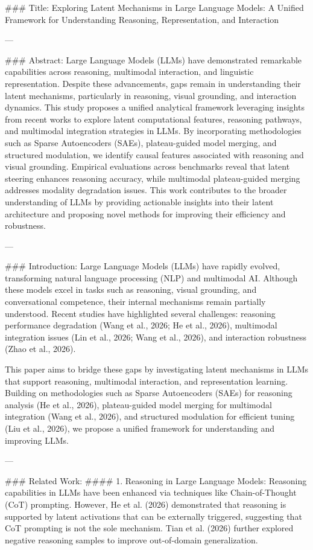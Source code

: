 ### Title:
Exploring Latent Mechanisms in Large Language Models: A Unified Framework for Understanding Reasoning, Representation, and Interaction

---

### Abstract:
Large Language Models (LLMs) have demonstrated remarkable capabilities across reasoning, multimodal interaction, and linguistic representation. Despite these advancements, gaps remain in understanding their latent mechanisms, particularly in reasoning, visual grounding, and interaction dynamics. This study proposes a unified analytical framework leveraging insights from recent works to explore latent computational features, reasoning pathways, and multimodal integration strategies in LLMs. By incorporating methodologies such as Sparse Autoencoders (SAEs), plateau-guided model merging, and structured modulation, we identify causal features associated with reasoning and visual grounding. Empirical evaluations across benchmarks reveal that latent steering enhances reasoning accuracy, while multimodal plateau-guided merging addresses modality degradation issues. This work contributes to the broader understanding of LLMs by providing actionable insights into their latent architecture and proposing novel methods for improving their efficiency and robustness.

---

### Introduction:
Large Language Models (LLMs) have rapidly evolved, transforming natural language processing (NLP) and multimodal AI. Although these models excel in tasks such as reasoning, visual grounding, and conversational competence, their internal mechanisms remain partially understood. Recent studies have highlighted several challenges: reasoning performance degradation (Wang et al., 2026; He et al., 2026), multimodal integration issues (Lin et al., 2026; Wang et al., 2026), and interaction robustness (Zhao et al., 2026).

This paper aims to bridge these gaps by investigating latent mechanisms in LLMs that support reasoning, multimodal interaction, and representation learning. Building on methodologies such as Sparse Autoencoders (SAEs) for reasoning analysis (He et al., 2026), plateau-guided model merging for multimodal integration (Wang et al., 2026), and structured modulation for efficient tuning (Liu et al., 2026), we propose a unified framework for understanding and improving LLMs.

---

### Related Work:
#### 1. Reasoning in Large Language Models:
Reasoning capabilities in LLMs have been enhanced via techniques like Chain-of-Thought (CoT) prompting. However, He et al. (2026) demonstrated that reasoning is supported by latent activations that can be externally triggered, suggesting that CoT prompting is not the sole mechanism. Tian et al. (2026) further explored negative reasoning samples to improve out-of-domain generalization.

